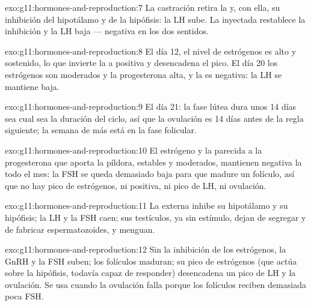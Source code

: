 \begin{solution}{exo:g11:hormones-and-reproduction:7}
La castración retira la  y, con ella, su inhibición del
hipotálamo y de la hipófisis: la LH sube. La  inyectada
restablece la inhibición y la LH baja ---  negativa en
los dos sentidos.
\end{solution}

\begin{solution}{exo:g11:hormones-and-reproduction:8}
El día 12, el nivel de estrógenos es alto y sostenido, lo que invierte
la  a positiva y desencadena el pico. El día 20 los
estrógenos son moderados y la progesterona alta, y la 
es negativa: la LH se mantiene baja.
\end{solution}

\begin{solution}{exo:g11:hormones-and-reproduction:9}
El día 21: la fase lútea dura unos 14 días sea cual sea la duración del
ciclo, así que la ovulación es 14 días antes de la regla siguiente; la
semana de más está en la fase folicular.
\end{solution}

\begin{solution}{exo:g11:hormones-and-reproduction:10}
El estrógeno y la  parecida a la progesterona que aporta la
píldora, estables y moderados, mantienen negativa la 
todo el mes: la FSH se queda demasiado baja para que madure un
folículo, así que no hay pico de estrógenos, ni 
positiva, ni pico de LH, ni ovulación.
\end{solution}

\begin{solution}{exo:g11:hormones-and-reproduction:11}
La  externa inhibe su hipotálamo y su hipófisis; la LH y la
FSH caen; sus testículos, ya sin estímulo, dejan de segregar y de
fabricar espermatozoides, y menguan.
\end{solution}

\begin{solution}{exo:g11:hormones-and-reproduction:12}
Sin la inhibición de los estrógenos, la GnRH y la FSH suben; los
folículos maduran; su pico de estrógenos (que actúa sobre la hipófisis,
todavía capaz de responder) desencadena un pico de LH y la ovulación.
Se usa cuando la ovulación falla porque los folículos reciben demasiada
poca FSH.
\end{solution}

